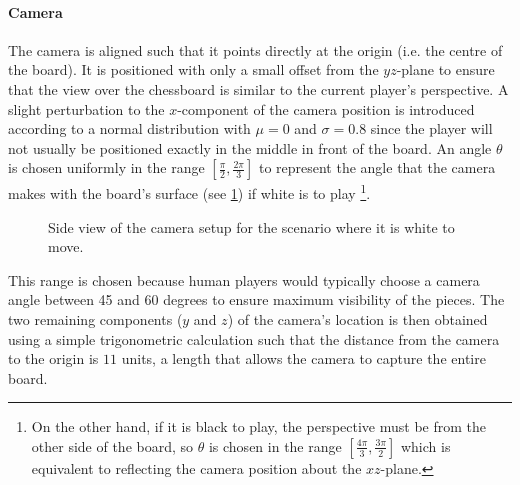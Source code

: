 \paragraph{Camera}
The camera is aligned such that it points directly at the origin (i.e. the centre of the board).
It is positioned with only a small offset from the $yz$-plane to ensure that the view over the chessboard is similar to the current player's perspective. 
A slight perturbation to the $x$-component of the camera position is introduced according to a normal distribution with $\mu=0$ and $\sigma=0.8$ since the player will not usually be positioned exactly in the middle in front of the board.
An angle $\theta$ is chosen uniformly in the range $\left[\frac{\pi}{2},\frac{2\pi}{3}\right]$ to represent the angle that the camera makes with the board's surface (see \cref{fig:camera_angle}) if white is to play%
\footnote{On the other hand, if it is black to play, the perspective must be from the other side of the board, so $\theta$ is chosen in the range $\left[\frac{4\pi}{3},\frac{3\pi}{2}\right]$ which is equivalent to reflecting the camera position about the $xz$-plane.}.
\begin{figure}
    \centering
    \caption{Side view of the camera setup for the scenario where it is white to move. }
    \label{fig:camera_angle}
\end{figure}
This range is chosen because human players would typically choose a camera angle between 45 and 60 degrees to ensure maximum visibility of the pieces.
The two remaining components ($y$ and $z$) of the camera's location is then obtained using a simple trigonometric calculation such that the distance from the camera to the origin is $11$ units, a length that allows the camera to capture the entire board.

